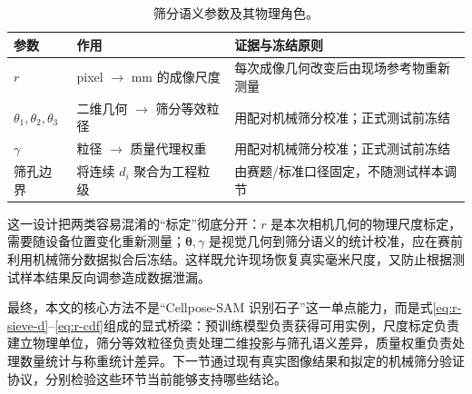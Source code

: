 \begin{table}[t]
\centering
\caption{筛分语义参数及其物理角色。}
\label{tab:r-sieve-params}
\footnotesize
\renewcommand{\arraystretch}{1.12}
\begin{tabular}{>{\raggedright\arraybackslash}p{2.2cm}>{\raggedright\arraybackslash}p{5.1cm}>{\raggedright\arraybackslash}p{5.7cm}}
\toprule
参数 & 作用 & 证据与冻结原则 \\
\midrule
$r$ & pixel $\rightarrow$ mm 的成像尺度 & 每次成像几何改变后由现场参考物重新测量 \\
$\theta_1,\theta_2,\theta_3$ & 二维几何 $\rightarrow$ 筛分等效粒径 & 用配对机械筛分校准；正式测试前冻结 \\
$\gamma$ & 粒径 $\rightarrow$ 质量代理权重 & 用配对机械筛分校准；正式测试前冻结 \\
筛孔边界 & 将连续 $d_i$ 聚合为工程粒级 & 由赛题/标准口径固定，不随测试样本调节 \\
\bottomrule
\end{tabular}
\end{table}

这一设计把两类容易混淆的“标定”彻底分开：$r$ 是本次相机几何的物理尺度标定，需要随设备位置变化重新测量；$\boldsymbol{\theta},\gamma$ 是视觉几何到筛分语义的统计校准，应在赛前利用机械筛分数据拟合后冻结。这样既允许现场恢复真实毫米尺度，又防止根据测试样本结果反向调参造成数据泄漏。

最终，本文的核心方法不是“Cellpose-SAM 识别石子”这一单点能力，而是式\eqref{eq:r-sieve-d}--\eqref{eq:r-cdf}组成的显式桥梁：预训练模型负责获得可用实例，尺度标定负责建立物理单位，筛分等效粒径负责处理二维投影与筛孔语义差异，质量权重负责处理数量统计与称重统计差异。下一节通过现有真实图像结果和拟定的机械筛分验证协议，分别检验这些环节当前能够支持哪些结论。